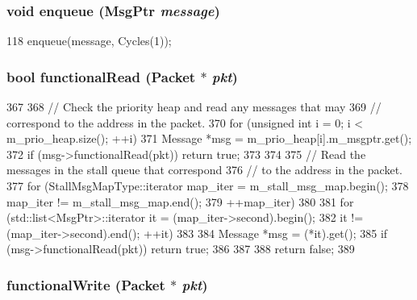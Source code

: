 \hypertarget{classMessageBuffer_a3e66951ea4f67cc6837309bf2c962ad4}{
\subsubsection[{enqueue}]{\setlength{\rightskip}{0pt plus 5cm}void enqueue ({\bf MsgPtr} {\em message})}}
\label{classMessageBuffer_a3e66951ea4f67cc6837309bf2c962ad4}



\begin{DoxyCode}
118 { enqueue(message, Cycles(1)); }
\end{DoxyCode}
\hypertarget{classMessageBuffer_a729f57f557bb42c045c47d9388f1030e}{
\subsubsection[{functionalRead}]{\setlength{\rightskip}{0pt plus 5cm}bool functionalRead ({\bf Packet} $\ast$ {\em pkt})}}
\label{classMessageBuffer_a729f57f557bb42c045c47d9388f1030e}



\begin{DoxyCode}
367 {
368     // Check the priority heap and read any messages that may
369     // correspond to the address in the packet.
370     for (unsigned int i = 0; i < m_prio_heap.size(); ++i) {
371         Message *msg = m_prio_heap[i].m_msgptr.get();
372         if (msg->functionalRead(pkt)) return true;
373     }
374 
375     // Read the messages in the stall queue that correspond
376     // to the address in the packet.
377     for (StallMsgMapType::iterator map_iter = m_stall_msg_map.begin();
378          map_iter != m_stall_msg_map.end();
379          ++map_iter) {
380 
381         for (std::list<MsgPtr>::iterator it = (map_iter->second).begin();
382             it != (map_iter->second).end(); ++it) {
383 
384             Message *msg = (*it).get();
385             if (msg->functionalRead(pkt)) return true;
386         }
387     }
388     return false;
389 }
\end{DoxyCode}
\hypertarget{classMessageBuffer_ad07b9def1d6f5e5f988a254c3a9d1ad9}{
\subsubsection[{functionalWrite}]{ functionalWrite ({\bf Packet} $\ast$ {\em pkt})}}
\label{classMessageBuffer_ad07b9def1d6f5e5f988a254c3a9d1ad9}



